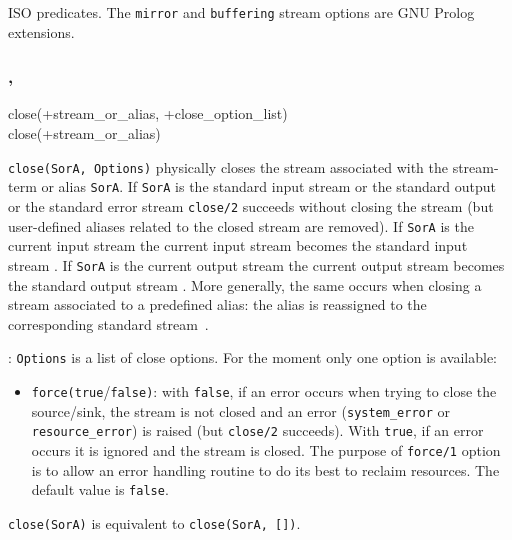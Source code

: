 \Portability

ISO predicates. The \texttt{mirror} and \texttt{buffering} stream options
are GNU Prolog extensions.

\subsubsection{,\label{close/2}
               }


\begin{TemplatesOneCol}
close(+stream\_or\_alias, +close\_option\_list)\\
close(+stream\_or\_alias)

\end{TemplatesOneCol}

\Description

\texttt{close(SorA, Options)} physically closes the stream associated
with the stream-term or alias \texttt{SorA}. If \texttt{SorA} is the
standard input stream or the standard output or the standard error
stream \texttt{close/2} succeeds without closing the stream (but
user-defined aliases related to the closed stream are removed). If
\texttt{SorA} is the current input stream the current input stream
becomes the standard input stream . If
\texttt{SorA} is the current output stream the current output stream
becomes the standard output stream . More
generally, the same occurs when closing a stream associated to a
predefined alias: the alias is reassigned to the corresponding
standard stream~.

: \texttt{Options} is a list of close options. For the
moment only one option is available:

\begin{itemize}

\item {}\texttt{force(true}/\texttt{false)}: with \texttt{false}, if
an error occurs when trying to close the source/sink, the stream is not
closed and an error (\texttt{system\_error} or \texttt{resource\_error}) is
raised (but \texttt{close/2} succeeds). With \texttt{true}, if an error
occurs it is ignored and the stream is closed. The purpose of
\texttt{force/1} option is to allow an error handling routine to do its best
to reclaim resources. The default value is \texttt{false}.

\end{itemize}

\texttt{close(SorA)} is equivalent to \texttt{close(SorA, [])}.

